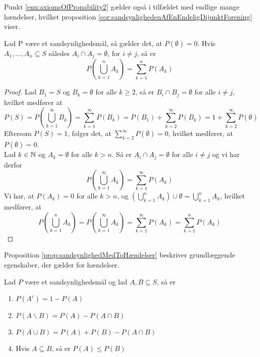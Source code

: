 Punkt \ref{enu:axiomsOfPropability2} gælder også i tilfældet med endlige mange hændelser, hvilket proposition \ref{cor:sandsynlighedenAfEnEndeligDijunktForening} viser. 

\begin{prop} \label{cor:sandsynlighedenAfEnEndeligDijunktForening} %
Lad P være et sandsynlighedsmål, så gælder det, at $P(\emptyset) = 0$. Hvis $A_1, \ldots , A_n \subseteq S$ således $A_i\cap A_j=\emptyset$, for $i \neq j$, så er
\begin{equation*}
    P\left(\bigcup^n_{k = 1} A_k\right) = \sum^n_{k = 1} P(A_k)
\end{equation*}
\end{prop}
\begin{proof}
Lad $B_1 = S$ og $B_k = \emptyset$ for alle $k \geq 2$, så er $B_i \cap B_j = \emptyset$ for alle $i \neq j$, hvilket medfører at \begin{equation*}
    P(S) = P\left(\bigcup^\infty_{k = 1} B_k\right) = \sum^\infty_{k = 1} P(B_k) = P(B_1) + \sum^\infty_{k = 2} P(B_k) = 1 + \sum^\infty_{k = 2} P(\emptyset) 
\end{equation*}
Eftersom $P(S) = 1$, følger det, at $\sum^\infty_{k = 2} P(\emptyset) = 0$, hvilket medfører, at $P(\emptyset) = 0$. \\
Lad $k\in \mathbb{N}$ og $A_k = \emptyset$ for alle $k > n$. Så er $A_i \cap A_j = \emptyset$ for alle $i \neq j$ og vi har derfor 
\begin{equation*}
    P\left(\bigcup_{k=1}^\infty A_k\right)=\sum_{k=1}^\infty P(A_k)
\end{equation*}
Vi har, at $P(A_k) = 0$ for alle $k > n$, og $\displaystyle\left(\bigcup^n_{k = 1} A_k\right) \cup \emptyset = \bigcup^n_{k = 1} A_k$, hvilket medfører, at
\begin{equation*}
   P\left(\bigcup_{k=1}^n A_k\right) = P\left(\bigcup_{k=1}^\infty A_k\right) = \sum_{k=1}^\infty P(A_k) = \sum_{k=1}^n P(A_k)
\end{equation*}
\end{proof} 
Proposition \ref{prop:sandsynlighedMedToHændelser} beskriver grundlæggende egenskaber, der gælder for hændelser. 
\begin{prop} \label{prop:sandsynlighedMedToHændelser} %
Lad $P$ være et sandsynlighedsmål og lad $A, B \subseteq S$, så er 
\begin{enumerate}
    \item $P(A^c) = 1 - P(A)$ \label{enu:propsandsynlighedMedToHændelser1}
    \item $P(A\backslash B) = P(A) - P(A \cap B)$ 
    \item $P(A \cup B) = P(A) + P(B) - P(A \cap B)$ 
    \item Hvis $A \subseteq B$, så er $P(A) \leq P(B)$
\end{enumerate}
\end{prop}
